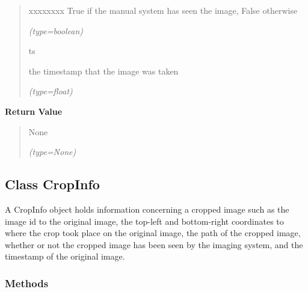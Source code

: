\begin{boxedminipage}{\funcwidth}
\begin{quote}
\begin{Ventry}{xxxxxxxx}
          True if the manual system has seen the image, False otherwise

            {\it (type=boolean)}

          \item[ts]

          the timestamp that the image was taken

            {\it (type=float)}

        \end{Ventry}

      \end{quote}

      \textbf{Return Value}
    \vspace{-1ex}

      \begin{quote}
      None

      {\it (type=None)}

      \end{quote}

    \end{boxedminipage}



\subsection{Class CropInfo}

    \label{client_rest:CropInfo}
A CropInfo object holds information concerning a cropped image such as the 
image id to the original image, the top-left and bottom-right coordinates 
to where the crop took place on the original image, the path of the cropped
image, whether or not the cropped image has been seen by the imaging 
system, and the timestamp of the original image.



  \subsubsection{Methods}

